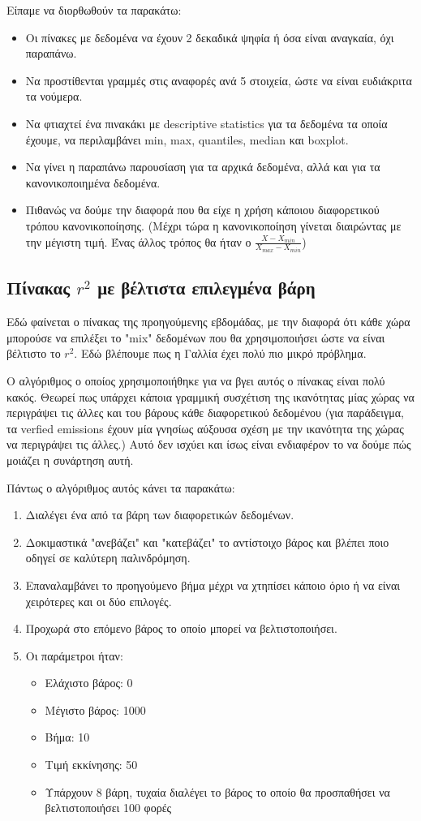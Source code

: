 \documentclass[a4paper,twoside,10pt]{article}
\begin{document}
	Είπαμε να διορθωθούν τα παρακάτω:
	\begin{itemize}
		\item Οι πίνακες με δεδομένα να έχουν 2 δεκαδικά ψηφία ή όσα είναι αναγκαία, όχι παραπάνω.
		\item Να προστίθενται γραμμές στις αναφορές ανά 5 στοιχεία, ώστε να είναι ευδιάκριτα τα νούμερα.
		\item Να φτιαχτεί ένα πινακάκι με descriptive statistics για τα δεδομένα τα οποία έχουμε, να περιλαμβάνει min, max, quantiles, median και boxplot.
		\item Να γίνει η παραπάνω παρουσίαση για τα αρχικά δεδομένα, αλλά και για τα κανονικοποιημένα δεδομένα.
		\item Πιθανώς να δούμε την διαφορά που θα είχε η χρήση κάποιου διαφορετικού τρόπου κανονικοποίησης. (Μέχρι τώρα η κανονικοποίηση γίνεται διαιρώντας με την μέγιστη τιμή. Ένας άλλος τρόπος θα ήταν ο $\frac{X- X_{min}}{X_{max}- X_{min}}$)
	\end{itemize}
	
	
	\subsection{Πίνακας $r^2$ με βέλτιστα επιλεγμένα βάρη}
	Εδώ φαίνεται ο πίνακας της προηγούμενης εβδομάδας, με την διαφορά ότι κάθε χώρα μπορούσε να επιλέξει το "mix" δεδομένων που θα χρησιμοποιήσει ώστε να είναι βέλτιστο το $r^2$. Εδώ βλέπουμε πως η Γαλλία έχει  πολύ πιο μικρό πρόβλημα. 
	
	Ο αλγόριθμος ο οποίος χρησιμοποιήθηκε για να βγει αυτός ο πίνακας είναι πολύ κακός. Θεωρεί πως υπάρχει κάποια γραμμική συσχέτιση της ικανότητας μίας χώρας να περιγράψει τις άλλες και του βάρους κάθε διαφορετικού δεδομένου (για παράδειγμα, τα verfied emissions έχουν μία γνησίως αύξουσα σχέση με την ικανότητα της χώρας να περιγράψει τις άλλες.) Αυτό δεν ισχύει και ίσως είναι ενδιαφέρον το να δούμε πώς μοιάζει η συνάρτηση αυτή. 
	
	Πάντως ο αλγόριθμος αυτός κάνει τα παρακάτω:
	\begin{enumerate}
		\item Διαλέγει ένα από τα βάρη των διαφορετικών δεδομένων.
		\item Δοκιμαστικά "ανεβάζει" και "κατεβάζει" το αντίστοιχο βάρος και βλέπει ποιο οδηγεί σε καλύτερη παλινδρόμηση.
		\item Επαναλαμβάνει το προηγούμενο βήμα μέχρι να χτηπίσει κάποιο όριο ή να είναι χειρότερες και οι δύο επιλογές.
		\item Προχωρά στο επόμενο βάρος το οποίο μπορεί να βελτιστοποιήσει.
		\item Οι παράμετροι ήταν:
		\begin{itemize}
			\item Ελάχιστο βάρος: 0
			\item Μέγιστο βάρος: 1000
			\item Βήμα: 10
			\item Τιμή εκκίνησης: 50
			\item Υπάρχουν 8 βάρη, τυχαία διαλέγει το βάρος το οποίο θα προσπαθήσει να βελτιστοποιήσει 100 φορές 
		\end{itemize}
	\end{enumerate}
	 
\end{document}
